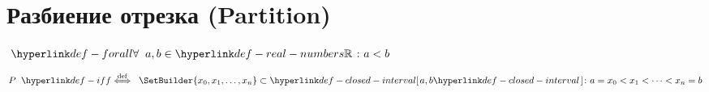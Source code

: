
\section{Разбиение отрезка (Partition)}

\hypertarget{def-partition}{}
\begin{definition}
\label{entity:obj-partition}
$\TerForall a, b \in \RealNumbers \colon a < b$

\[
P \TermDefIff
\SetBuilder{x_0, x_1, \ldots, x_n} \subset \ClosedInterval{a, b}
\colon a = x_0 < x_1 < \cdots < x_n = b
\]
\end{definition}